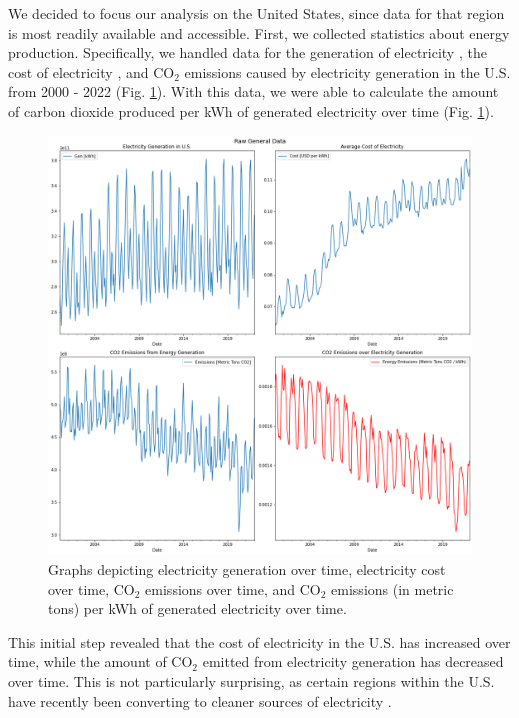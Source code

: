 \documentclass{article}
\begin{document}
We decided to focus our analysis on the United States, since data for that region is most readily available and accessible. First, we collected statistics about energy production. Specifically, we handled data for the generation of electricity \cite{elec_gen}, the cost of electricity \cite{elec_cost}, and $\text{CO}_2$ emissions caused by electricity generation \cite{co2} in the U.S. from 2000 - 2022 (Fig. \ref{fig:us_data}). With this data, we were able to calculate the amount of carbon dioxide produced per kWh of generated electricity over time (Fig. \ref{fig:us_data}).

\begin{figure}[h!]
    \centering
    \includegraphics[width=\linewidth]{images/us_energy_data.png}
    \caption{Graphs depicting electricity generation over time, electricity cost over time, $\text{CO}_2$ emissions over time, and $\text{CO}_2$ emissions (in metric tons) per kWh of generated electricity over time. }
    \label{fig:us_data}
\end{figure}

This initial step revealed that the cost of electricity in the U.S. has increased over time, while the amount of $\text{CO}_2$ emitted from electricity generation has decreased over time. This is not particularly surprising, as certain regions within the U.S. have recently been converting to cleaner sources of electricity \cite{clean_energy}.
\end{document}
